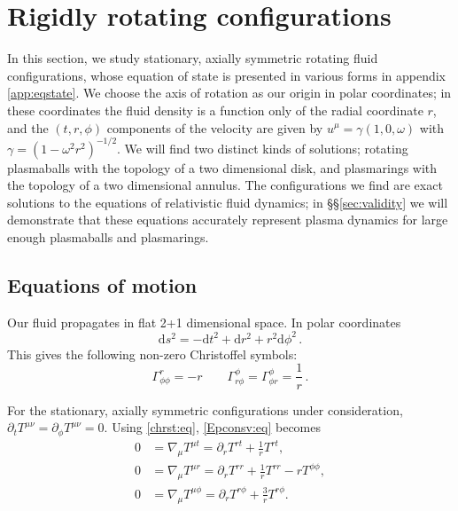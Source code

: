 \documentclass[12pt,a4paper]{article}
\newcommand{\prn}[1]{\left ( #1 \right )}
\newcommand{\dr}{\mathrm{d}}
\newcommand{\p}{\partial}
\begin{document}
\section{Rigidly rotating configurations}\label{sec:eqmot}

In this section, we study stationary, axially symmetric rotating
fluid configurations, whose equation of state is  presented in
various forms in appendix \ref{app:eqstate}. We choose the axis of
rotation as our origin in polar coordinates; in these coordinates
the fluid density is a function only of the radial coordinate $r$,
and the $(t,r,\phi)$ components of the velocity are given by $u^\mu
= \gamma(1,0,\omega)$ with $\gamma=\prn{1-\omega^2r^2}^{-1/2}$.  We
will find two distinct kinds of solutions; rotating plasmaballs with
the topology of a two dimensional disk, and plasmarings with the
topology of a two dimensional annulus. The configurations we find
are exact solutions to the equations of relativistic fluid dynamics;
in \S\S\ref{sec:validity} we will demonstrate that these equations
accurately represent plasma dynamics for large enough plasmaballs
and plasmarings.

\subsection{Equations of motion}

Our fluid propagates in flat 2+1 dimensional space. In polar
coordinates
%
\begin{equation}\label{metric:eq}
  \dr s^2 = -\dr t^2 + \dr r^2 + r^2 \dr \phi^2\,.
\end{equation}
%
This gives the following non-zero Christoffel symbols:
%
\begin{equation}\label{chrst:eq}
  \Gamma^r_{\phi\phi} = -r \qquad
  \Gamma^\phi_{r\phi} = \Gamma^\phi_{\phi r} =
  \frac{1}{r}\,.
\end{equation}
%

For the  stationary, axially symmetric configurations under
consideration, $\p_t T^{\mu \nu}= \p_\phi T^{\mu \nu} = 0$. Using
\eqref{chrst:eq}, \eqref{Epconsv:eq} becomes
%
\begin{align}\label{tEpconsv:eq}
    0 &= \nabla_\mu T^{\mu t}
       = \p_r T^{rt} + \frac{1}{r}T^{rt}, \\ \label{rEpconsv:eq}
    0 &= \nabla_\mu T^{\mu r}
       = \p_r T^{rr} + \frac{1}{r}T^{rr} - r T^{\phi\phi}, \\ \label{fEpconsv:eq}
    0 &= \nabla_\mu T^{\mu \phi}
       = \p_r T^{r\phi} + \frac{3}{r}T^{r\phi}.
\end{align}
%
\end{document}
